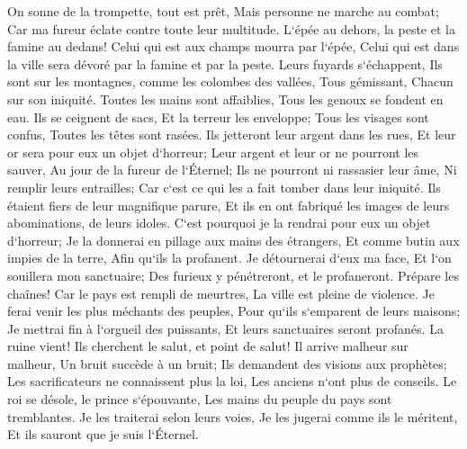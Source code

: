 \verse On sonne de la trompette, tout est prêt, Mais personne ne marche au combat; Car ma fureur éclate contre toute leur multitude. 
\verse L`épée au dehors, la peste et la famine au dedans! Celui qui est aux champs mourra par l`épée, Celui qui est dans la ville sera dévoré par la famine et par la peste. 
\verse Leurs fuyards s`échappent, Ils sont sur les montagnes, comme les colombes des vallées, Tous gémissant, Chacun sur son iniquité. 
\verse Toutes les mains sont affaiblies, Tous les genoux se fondent en eau. 
\verse Ils se ceignent de sacs, Et la terreur les enveloppe; Tous les visages sont confus, Toutes les têtes sont rasées. 
\verse Ils jetteront leur argent dans les rues, Et leur or sera pour eux un objet d`horreur; Leur argent et leur or ne pourront les sauver, Au jour de la fureur de l`Éternel; Ils ne pourront ni rassasier leur âme, Ni remplir leurs entrailles; Car c`est ce qui les a fait tomber dans leur iniquité. 
\verse Ils étaient fiers de leur magnifique parure, Et ils en ont fabriqué les images de leurs abominations, de leurs idoles. C`est pourquoi je la rendrai pour eux un objet d`horreur; 
\verse Je la donnerai en pillage aux mains des étrangers, Et comme butin aux impies de la terre, Afin qu`ils la profanent. 
\verse Je détournerai d`eux ma face, Et l`on souillera mon sanctuaire; Des furieux y pénétreront, et le profaneront. 
\verse Prépare les chaînes! Car le pays est rempli de meurtres, La ville est pleine de violence. 
\verse Je ferai venir les plus méchants des peuples, Pour qu`ils s`emparent de leurs maisons; Je mettrai fin à l`orgueil des puissants, Et leurs sanctuaires seront profanés. 
\verse La ruine vient! Ils cherchent le salut, et point de salut! 
\verse Il arrive malheur sur malheur, Un bruit succède à un bruit; Ils demandent des visions aux prophètes; Les sacrificateurs ne connaissent plus la loi, Les anciens n`ont plus de conseils. 
\verse Le roi se désole, le prince s`épouvante, Les mains du peuple du pays sont tremblantes. Je les traiterai selon leurs voies, Je les jugerai comme ils le méritent, Et ils sauront que je suis l`Éternel. 

